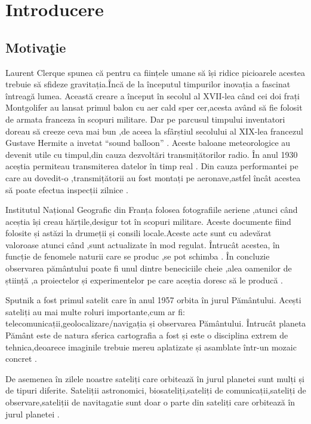\documentclass[12pt,a4paper]{article}
\theoremstyle{definition}
\theoremstyle{remark}
\begin{document}
\section*{{\bf Introducere}}
\markright{}
\setcounter{section}{1}
\subsection{{Motiva\c tie}}

Laurent Clerque spunea că pentru ca ființele umane să își ridice picioarele acestea trebuie să sfideze gravitația.Încă de la începutul timpurilor inovația a fascinat întreagă lumea. Această creare a început în  secolul al XVII-lea când cei doi frați Montgolifer au lansat primul balon cu aer cald sper cer,acesta având să fie folosit de armata franceza în scopuri militare. Dar pe parcusul timpului inventatori doreau să creeze ceva mai bun ,de aceea la sfârștiul secolului al XIX-lea francezul Gustave Hermite a invetat “sound balloon” . Aceste baloane meteorologice au devenit utile cu timpul,din cauza dezvoltări transmițătorilor  radio. În anul 1930 aceștia permiteau transmiterea datelor în timp real . Din cauza performantei pe care au dovedit-o ,transmițătorii au fost montați pe aeronave,astfel încât acestea să poate efectua inspecții zilnice \cite{istorie} \cite{istorie2}.


Institutul Național Geografic din Franța folosea fotografiile aeriene ,atunci când aceștia își creau hărțile,desigur tot în scopuri militare. Aceste documente fiind folosite și astăzi la drumeții și consili locale.Aceste acte sunt cu adevărat valoroase  atunci când ,sunt actualizate în mod regulat. Întrucât acestea, în funcție de fenomele naturii care se produc ,se pot schimba . În concluzie observarea pământului poate fi unul dintre beneciciile cheie ,alea oamenilor de știință ,a proiectelor și experimentelor pe care aceștia doresc să le producă \cite{istorie} \cite{istorie2}.


Sputnik a fost primul satelit care în anul 1957 orbita în jurul Pământului. Acești sateliți au mai multe roluri importante,cum ar fi: telecomunicații,geolocalizare/navigația și observarea Pământului. Întrucât planeta Pământ este de natura sferica cartografia a fost și este o disciplina extrem de tehnica,deoarece imaginile trebuie mereu aplatizate și asamblate într-un mozaic concret \cite{wikisputnik}.


De asemenea în zilele noastre sateliți care orbitează în jurul planetei sunt mulți și de tipuri diferite. Sateliții astronomici, biosateliți,sateliți de comunicații,sateliți de observare,sateliții de navitagatie sunt doar o parte din sateliți care orbitează în jurul planetei \cite{wikisputnik}.
\end{document}
